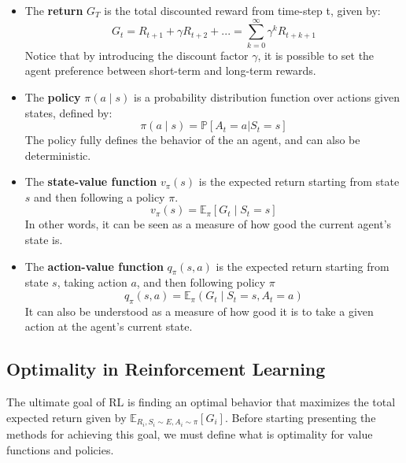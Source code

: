 \begin{itemize}
\item
	The \textbf{return} $G_T$ is the total discounted reward from time-step t, given by:
	\begin{equation}
	G_t = R_{t+1} + \gamma R_{t+2} + ... = \sum_{k=0}^{\infty}{\gamma^k R_{t+k+1}}
	\end{equation}
	Notice that by introducing the discount factor $\gamma$, it is possible to set the agent preference between short-term and long-term rewards.
\item
	The \textbf{policy} $\pi(a \mid s)$ is a probability distribution function over actions given states, defined by:
	\begin{equation}
	\pi(a \mid s) = \mathbb{P}[A_t=a | S_t=s]
	\end{equation}
	The policy fully defines the behavior of the an agent, and can also be deterministic.
\item
	The \textbf{state-value function} $v_{\pi}(s)$ is the expected return starting from state $s$ and then following a policy $\pi$.
	\begin{equation}
	v_{\pi}(s) = \mathbb{E}_{\pi}[G_t \mid S_t = s]
	\label{eq:state_value_function_definition}
	\end{equation}
	In other words, it can be seen as a measure of how good the current agent's state is.
\item
	The \textbf{action-value function} $q_{\pi}(s,a)$ is the expected return starting from state $s$, taking action $a$, and then following policy $\pi$
	\begin{equation}
	q_{\pi}(s,a) = \mathbb{E}_{\pi}(G_t \mid S_t = s, A_t = a)
	\label{eq:action_value_function_definition}
	\end{equation}
	It can also be understood as a measure of how good it is to take a given action at the agent's current state.
\end{itemize}

\subsection{Optimality in Reinforcement Learning}

The ultimate goal of RL is finding an optimal behavior that maximizes the total expected return given by $\mathbb{E}_{R_i,S_i \sim E, A_i \sim \pi}[G_i]$. Before starting presenting the methods for achieving this goal, we must define what is optimality for value functions and policies.

